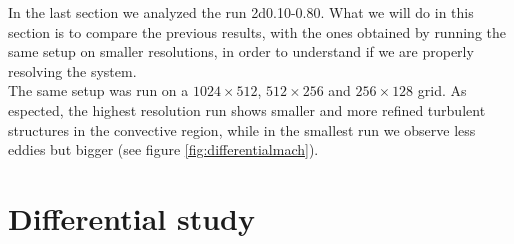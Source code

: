 In the last section we analyzed the run 2d0.10-0.80. What we will do in this section is to compare the previous results, with the ones obtained by running the same setup on smaller resolutions, in order to understand if we are properly resolving the system. \\
The same setup was run on a $1024 \times 512$, $512 \times 256$ and $256 \times 128$ grid. As espected, the highest resolution run shows smaller and more refined turbulent structures in the convective region, while in the smallest run we observe less eddies but bigger (see figure \ref{fig:differentialmach}).
\section{Differential study}
